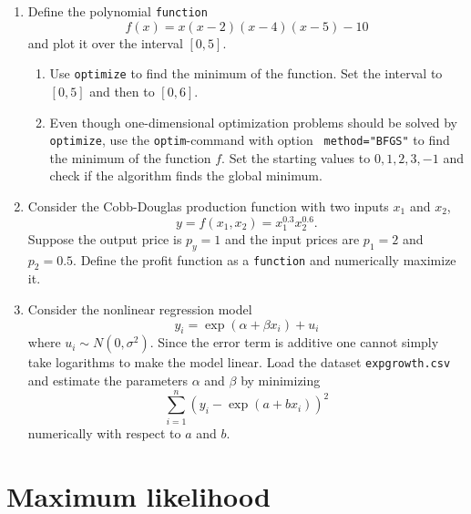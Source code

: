 \documentclass{article}
\begin{document}
\begin{enumerate}
\item Define the polynomial \texttt{function}%
\begin{equation*}
f(x)=x\left( x-2\right) \left( x-4\right) \left( x-5\right) -10
\end{equation*}%
and plot it over the interval $[0,5]$.

\begin{enumerate}
\item Use \texttt{optimize} to find the minimum of the function. Set the
interval to $[0,5]$ and then to $[0,6].$

\item Even though one-dimensional optimization problems should be solved by 
\texttt{optimize}, use the \texttt{optim}-command with option \texttt{%
method="BFGS"} to find the minimum of the function $f$. Set the starting
values to $0,1,2,3,-1$ and check if the algorithm finds the global minimum.
\end{enumerate}

\item Consider the Cobb-Douglas production function with two inputs $x_{1}$
and $x_{2}$,%
\begin{equation*}
y=f(x_{1},x_{2})=x_{1}^{0.3}x_{2}^{0.6}.
\end{equation*}%
Suppose the output price is $p_{y}=1$ and the input prices are $p_{1}=2$ and 
$p_{2}=0.5$. Define the profit function as a \texttt{function} and
numerically maximize it.

\item Consider the nonlinear regression model%
\begin{equation*}
y_{i}=\exp \left( \alpha +\beta x_{i}\right) +u_{i}
\end{equation*}%
where $u_{i}\sim N(0,\sigma ^{2})$. Since the error term is additive one
cannot simply take logarithms to make the model linear. Load the dataset 
\texttt{expgrowth.csv} and estimate the parameters $\alpha $ and $\beta $ by
minimizing%
\begin{equation*}
\sum_{i=1}^{n}\left( y_{i}-\exp \left( a+bx_{i}\right) \right) ^{2}
\end{equation*}%
numerically with respect to $a$ and $b$.
\end{enumerate}
\newpage


\section{Maximum likelihood}
\end{document}
